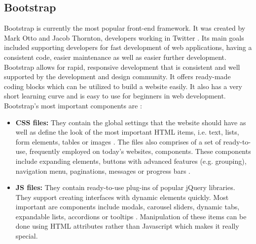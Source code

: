 \subsection{Bootstrap}
Bootstrap is currently the most popular front-end framework. It was created by Mark Otto and Jacob Thornton, developers working in Twitter \cite{FrontEndSKI}. Its main goals included supporting developers for fast development of web applications, having a consistent code, easier maintenance as well as easier further development. Bootstrap allows for rapid, responsive development that is consistent and well supported by the development and design community. It offers ready-made coding blocks which can be utilized to build a website easily. It also has a very short learning curve and is easy to use for beginners in web development. Bootstrap's most important components are \cite{FrontEndSKI}:
\begin{itemize}
	\item \textbf{CSS files:} They contain the global settings that the website should have as well as define the look of the most important HTML items, i.e. text, lists, form elements, tables or images \cite{FrontEndSKI}. The files also comprises of a set of ready-to-use, frequently employed on today’s websites, components. These components include expanding elements, buttons with advanced features (e.g. grouping), navigation menu, paginations, messages or progress bars \cite{FrontEndSKI}.
	\item \textbf{JS files:} They contain ready-to-use plug-ins of popular jQuery libraries. They support creating interfaces with dynamic elements quickly. Most important are components include modals, carousel sliders, dynamic tabs, expandable lists, accordions or tooltips \cite{FrontEndSKI}. Manipulation of these items can be done using HTML attributes rather than Javascript which makes it really special.
\end{itemize}
